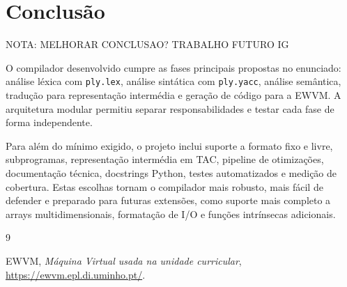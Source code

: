 \documentclass[11pt,a4paper]{report}
\begin{document}
\section{Conclusão}

NOTA: MELHORAR CONCLUSAO? TRABALHO FUTURO IG

O compilador desenvolvido cumpre as fases principais propostas no enunciado: análise léxica com \texttt{ply.lex}, análise sintática com \texttt{ply.yacc}, análise semântica, tradução para representação intermédia e geração de código para a EWVM. A arquitetura modular permitiu separar responsabilidades e testar cada fase de forma independente.

Para além do mínimo exigido, o projeto inclui suporte a formato fixo e livre, subprogramas, representação intermédia em TAC, pipeline de otimizações, documentação técnica, docstrings Python, testes automatizados e medição de cobertura. Estas escolhas tornam o compilador mais robusto, mais fácil de defender e preparado para futuras extensões, como suporte mais completo a arrays multidimensionais, formatação de I/O e funções intrínsecas adicionais.


\begin{thebibliography}{9}

EWVM, \emph{Máquina Virtual usada na unidade curricular}, \url{https://ewvm.epl.di.uminho.pt/}.
\end{thebibliography}
\end{document}
